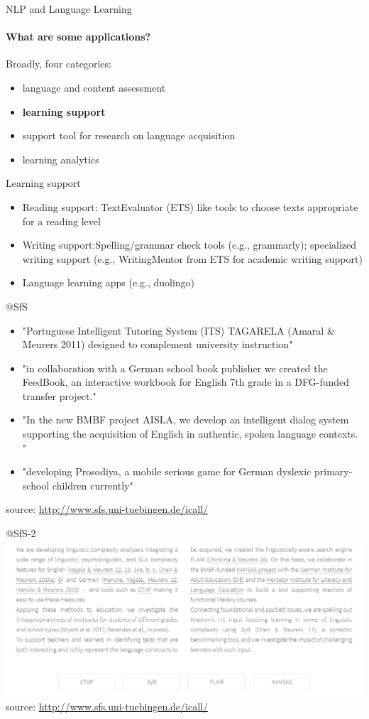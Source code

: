 \documentclass{beamer}
\begin{document}
\begin{frame}{NLP and Language Learning}
\framesubtitle{What are some applications?}
Broadly, four categories:
\begin{itemize}
    \item language and content assessment
    \item \textbf{learning support}
    \item support tool for research on language acquisition
    \item learning analytics
\end{itemize}
\end{frame}

\begin{frame}{Learning support}
    \begin{itemize}
    \item Reading support: TextEvaluator (ETS) like tools to choose texts appropriate for a reading level
        \item Writing support:Spelling/grammar check tools (e.g., grammarly); specialized writing support (e.g., WritingMentor from ETS for academic writing support)
        \item Language learning apps (e.g., duolingo)
    \end{itemize}
\end{frame}

\begin{frame}{@SfS}
    \begin{itemize}
        \item "Portuguese Intelligent Tutoring System (ITS) TAGARELA (Amaral & Meurers 2011) designed to complement university instruction"
        \item "in collaboration with a German school book publisher we created the FeedBook, an interactive workbook for English 7th grade in a DFG-funded transfer project."
        \item "In the new BMBF project AISLA, we develop an intelligent dialog system supporting the acquisition of English in authentic, spoken language contexts. "
            \item "developing Prosodiya, a mobile serious game for German dyslexic primary-school children currently"
    \end{itemize}
    source: \url{http://www.sfs.uni-tuebingen.de/icall/}
\end{frame}

\begin{frame}{@SfS-2}
\includegraphics[width=\textwidth]{figures/sfs2.PNG}
source: \url{http://www.sfs.uni-tuebingen.de/icall/}
\end{frame}
\end{document}
